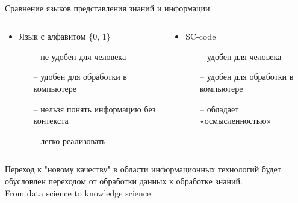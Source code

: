 \begin{frame}{\\Сравнение языков представления знаний и информации}
	\begin{columns}[T,onlytextwidth]
		\begin{column}{0.5\textwidth}
			\begin{itemize}
				\item Язык с алфавитом \{0, 1\}
				\begin{itemize}
					\item[--] не удобен для человека
					\item[--] удобен для обработки в компьютере
					\item[--] нельзя понять информацию без контекста
					\item[--] легко реализовать
				\end{itemize}
			\end{itemize}
		\end{column}
		\begin{column}{0.5\textwidth}
			\begin{itemize}
				\item SC-code
				\begin{itemize}
					\item[--] удобен для человека
					\item[--] удобен для обработки в компьютере
					\item[--] обладает «осмысленностью»
				\end{itemize}
			\end{itemize}
		\end{column}
	\end{columns}
	\vspace{5mm}
	Переход к "новому качеству" в области информационных технологий будет обусловлен переходом от обработки данных к обработке знаний.
	\\ From data science to knowledge science
\end{frame}

